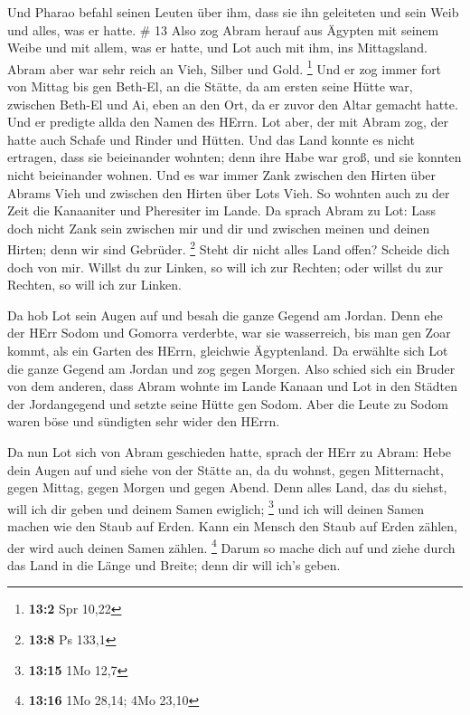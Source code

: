  Und Pharao befahl seinen Leuten über ihm, dass sie ihn
geleiteten und sein Weib und alles, was er hatte. \# 13 
Also zog Abram herauf aus Ägypten mit seinem Weibe und mit allem, was er
hatte, und Lot auch mit ihm, ins Mittagsland.  Abram aber
war sehr reich an Vieh, Silber und Gold. \footnote{\textbf{13:2} Spr
  10,22}  Und er zog immer fort von Mittag bis gen Beth-El,
an die Stätte, da am ersten seine Hütte war, zwischen Beth-El und Ai,
 eben an den Ort, da er zuvor den Altar gemacht hatte. Und
er predigte allda den Namen des HErrn.  Lot aber, der mit
Abram zog, der hatte auch Schafe und Rinder und Hütten.  Und
das Land konnte es nicht ertragen, dass sie beieinander wohnten; denn
ihre Habe war groß, und sie konnten nicht beieinander wohnen.
 Und es war immer Zank zwischen den Hirten über Abrams Vieh
und zwischen den Hirten über Lots Vieh. So wohnten auch zu der Zeit die
Kanaaniter und Pheresiter im Lande.  Da sprach Abram zu Lot:
Lass doch nicht Zank sein zwischen mir und dir und zwischen meinen und
deinen Hirten; denn wir sind Gebrüder. \footnote{\textbf{13:8} Ps 133,1}
 Steht dir nicht alles Land offen? Scheide dich doch von
mir. Willst du zur Linken, so will ich zur Rechten; oder willst du zur
Rechten, so will ich zur Linken.

 Da hob Lot sein Augen auf und besah die ganze Gegend am
Jordan. Denn ehe der HErr Sodom und Gomorra verderbte, war sie
wasserreich, bis man gen Zoar kommt, als ein Garten des HErrn, gleichwie
Ägyptenland.  Da erwählte sich Lot die ganze Gegend am
Jordan und zog gegen Morgen. Also schied sich ein Bruder von dem
anderen,  dass Abram wohnte im Lande Kanaan und Lot in den
Städten der Jordangegend und setzte seine Hütte gen Sodom. 
Aber die Leute zu Sodom waren böse und sündigten sehr wider den HErrn.

 Da nun Lot sich von Abram geschieden hatte, sprach der
HErr zu Abram: Hebe dein Augen auf und siehe von der Stätte an, da du
wohnst, gegen Mitternacht, gegen Mittag, gegen Morgen und gegen Abend.
 Denn alles Land, das du siehst, will ich dir geben und
deinem Samen ewiglich; \footnote{\textbf{13:15} 1Mo 12,7} 
und ich will deinen Samen machen wie den Staub auf Erden. Kann ein
Mensch den Staub auf Erden zählen, der wird auch deinen Samen zählen.
\footnote{\textbf{13:16} 1Mo 28,14; 4Mo 23,10}  Darum so
mache dich auf und ziehe durch das Land in die Länge und Breite; denn
dir will ich's geben.

